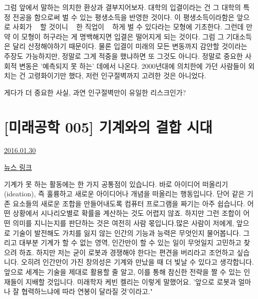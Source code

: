 그럼 앞에서 말하는 의치한 환상과 결부지어보자.
대학의 입결이라는 건 그 대학의 특정 전공을 함으로써 벌 수 있는 평생소득을 반영한 것이다.
이 평생소득이라함은 앞으로 사회가 ~ 할 것이니 ~ 한 직업이 ~ 하게 벌 수 있다라는 모형에 기초한다.
그런데 만약 이 모형이 허구라는 게 명백해지면 입결은 떨어지게 되는 것이다. 그럼 그 기대소득은 달리 산정해야하기 때문이다.
물론 입결이 미래의 모든 변동까지 감안할 것이라는 주장도 가능하지만, 정말로 그게 적중을 했냐하면 또 그것도 아니다.
정말로 중요한 사회적 변동은 '예측되지 못 하는' 데에서 나온다.
2000년대에 의치한에 가던 사람들이 외치는 건 고령화이기만 했다, 저런 인구절벽까지 고려한 것은 아니었다.
\vspace{5mm}

게다가 더 중요한 사실, 과연 인구절벽만이 유일한 리스크인가?
\vspace{5mm}







\section{[미래공학 005] 기계와의 결합 시대}
\href{https://www.kockoc.com/Apoc/617674}{2016.01.30}

\vspace{5mm}

\href{http://news.naver.com/main/read.nhn?mode=LSD&mid=sec&sid1=101&oid=023&aid=0003133206}{뉴스 링크}
\vspace{5mm}

기계가 못 하는 활동에는 한 가지 공통점이 있습니다. 바로 아이디어 떠올리기(ideation), 즉 훌륭하고 새로운 아이디어나 개념을 떠올리는 행동입니다.
단어 같은 기존 요소들의 새로운 조합을 만들어내도록 컴퓨터 프로그램을 짜기는 아주 쉽습니다. 어떤 상황에서 시나리오별로 확률을 계산하는 것도 어렵지 않죠. 하지만 그런 조합이 어떤 의미를 지니는지를 판단하는 것은 여전히 사람 몫입니다.많은 사람이 저에게, 앞으로 기술이 발전해도 가치를 잃지 않는 인간의 기능과 능력은 무엇인지 물어봅니다. 그리고 대부분 기계가 할 수 없는 영역, 인간만이 할 수 있는 일이 무엇일지 고민하고 찾으려 하죠. 하지만 저는 굳이 로봇과 경쟁해야 한다는 편견을 버리라고 조언하고 싶습니다. 오히려 인간만이 가진 창의성은 기계와 만났을 때 더 빛날 수 있다고 생각합니다. 앞으로 세계는 기술을 제대로 활용할 줄 알고, 이를 통해 참신한 전략을 짤 수 있는 인재들이 지배할 것입니다. 미래학자 케빈 켈리는 이렇게 말했어요. '앞으로 로봇과 얼마나 잘 협력하느냐에 따라 연봉이 달라질 것'이라고."
\vspace{5mm}

